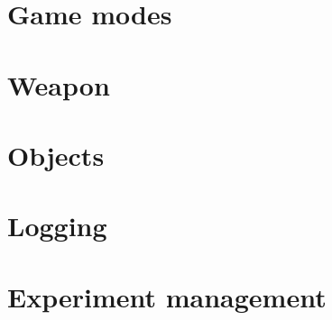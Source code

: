 
\section{Game modes}


\section{Weapon}


\section{Objects}


\section{Logging}


\section{Experiment management}

